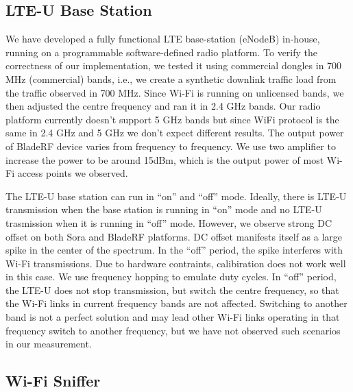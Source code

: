 \subsection{LTE-U Base Station}


We have developed a fully functional LTE base-station (eNodeB) in-house, 
running on a programmable software-defined radio platform. 
To verify the correctness of our implementation, 
we tested it using commercial dongles in 700 MHz (commercial) bands, 
i.e., we create a synthetic downlink traffic load from the traffic observed in 700 MHz. 
Since Wi-Fi is running on unlicensed bands,  
we then adjusted the centre frequency and ran it in 2.4 GHz bands. 
Our radio platform currently doesn't support 5 GHz bands but since WiFi protocol is the same 
in 2.4 GHz and 5 GHz we don't expect different results. 
The output power of BladeRF device varies from frequency to frequency. 
We use two amplifier to increase the power to be around 15dBm,
which is the output power of most Wi-Fi access points we observed. 

The LTE-U base station can run in ``on'' and ``off'' mode. 
Ideally, there is LTE-U transmission when the base station
is running in ``on'' mode and no LTE-U trasmission when
it is running in ``off'' mode.
However, we observe strong DC offset on both Sora and BladeRF platforms. 
DC offset manifests itself as a large spike in the center of the spectrum. 
In the ``off'' period, the spike interferes with Wi-Fi 
transmissions. 
Due to hardware contraints, calibiration does not work well in this case. 
We use frequency hopping to emulate duty cycles. 
In ``off'' period, the LTE-U does not stop transmission, but
switch the centre frequency, so that the Wi-Fi 
links in current frequency bands are not affected. 
Switching to another band is not a perfect solution
and may lead other Wi-Fi links operating in that frequency
switch to another frequency, 
but we have not observed such scenarios in our measurement. 

\subsection{Wi-Fi Sniffer}


